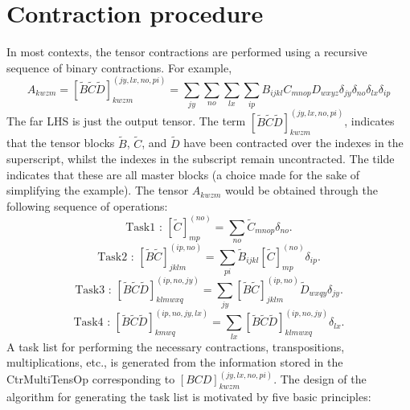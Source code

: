 \section{Contraction procedure } 
\noindent In most contexts, the tensor contractions are performed using a recursive sequence of binary contractions. For example,
\begin{equation}
A_{kwzm} = 
[\tilde{B}\tilde{C}\tilde{D}]^{(jy,lx,no,pi)}_{kwzm} = \sum_{jy}\sum_{no}\sum_{lx}\sum_{ip} B_{ijkl}C_{mnop}D_{wxyz} \delta_{jy} \delta_{no} \delta_{lx}\delta_{ip}
\end{equation}
The far LHS is just the output tensor. 
The term $[\tilde{B}\tilde{C}\tilde{D}]^{(jy,lx,no,pi)}_{kwzm}$, indicates that the tensor blocks
$\tilde{B}$, $\tilde{C}$, and $\tilde{D}$ have been contracted over the indexes in the superscript, whilst
the indexes in the subscript remain uncontracted. The tilde indicates that these are
all master blocks (a choice made for the sake of simplifying the example). 
The tensor $A_{kwzm}$ would be obtained through the following sequence of operations:
\begin{equation}
\text{Task1 \ : \ \ }
[\tilde{C}]^{(no)}_{mp} = \sum_{no} \tilde{C}_{mnop}\delta_{no}.
\label{eqn:ctr_list_t1}
\end{equation}
\begin{equation}
\text{Task2 \ : \ \ }
[\tilde{B}\tilde{C}]^{(ip,no)}_{jklm} = \sum_{pi} \tilde{B}_{ijkl}[\tilde{C}]_{mp}^{(no)}\delta_{ip}.
\label{eqn:ctr_list_t2}
\end{equation}
\begin{equation}
\text{Task3 \ : \ \ }
[\tilde{B}\tilde{C}\tilde{D}]^{(ip,no,jy)}_{klmwxq} = \sum_{jy} [\tilde{B}\tilde{C}]^{(ip,no)}_{jklm}
 \tilde{D}_{wxqy}\delta_{jy}.
\label{eqn:ctr_list_t3}
\end{equation}
\begin{equation}
\text{Task4 \ : \ \ }
[\tilde{B}\tilde{C}\tilde{D}]^{(ip,no,jy,lx)}_{kmwq} = \sum_{lx}
[\tilde{B}\tilde{C}\tilde{D}]^{(ip,no,jy)}_{klmwxq}\delta_{lx}.
\label{eqn:ctr_list_t4}
\end{equation}
A task list for performing the necessary contractions, transpositions, multiplications, etc.,
is generated from the information stored in the CtrMultiTensOp corresponding to $[BCD]^{(jy,lx,no,pi)}_{kwzm}$.
The design of the algorithm for generating the task list is motivated by five basic principles: 
